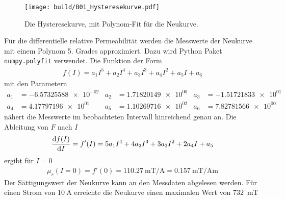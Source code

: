 \begin{figure}
    \texttt{[image: build/B01\_Hysteresekurve.pdf]}
    \caption{Die Hysteresekurve, mit Polynom-Fit für die Neukurve.}
    \label{fig:Hysteresekurve_werte}
\end{figure}

Für die differentielle relative Permeabilität werden die Messwerte der Neukurve mit einem Polynom 5. Grades approximiert.
Dazu wird Python Paket \texttt{numpy.polyfit} \cite[][]{numpy} verwendet. 
Die Funktion der Form
\begin{align}
    f(I) = a_1 I^5 + a_2 I^4 + a_3 I^3 + a_4 I^2 + a_5 I + a_6 
\end{align}
mit den Parametern
\begin{align*}
    a_1 &=  \num{-6.57325588e-02} &
    a_2 &=  \num{1.71820149e+00} &
    a_3 &=  \num{-1.51721833e+01} \\
    a_4 &=  \num{4.17797196e+01} &
    a_5 &=  \num{1.10269716e+02} &
    a_6 &=  \num{7.82781566e+00} &
\end{align*}
nähert die Messwerte im beobachteten Intervall hinreichend genau an.
Die Ableitung von $F$ nach $I$ 
\begin{align*}
   \frac{\mathop{}\!\mathrm{d} f(I)}{\mathop{}\!\mathrm{d} I} = f'(I) = 5a_1 I^4 + 4a_2 I^3 + 3a_3 I^2 + 2a_4 I + a_5   
\end{align*}
ergibt für $I=0$
\begin{align}
    \mu_{r}(I=0) = f'(0) = \qty{110.27}{\milli\tesla\per\ampere} = \qty{0.157}{\milli\tesla\per\ampere\meter} 
\end{align}
Der Sättigungswert der Neukurve kann an den Messdaten abgelesen werden. 
Für einen Strom von $\qty[]{10}{\ampere}$ erreichte die Neukurve einen maximalen Wert von \qty{732}{\milli\tesla}
